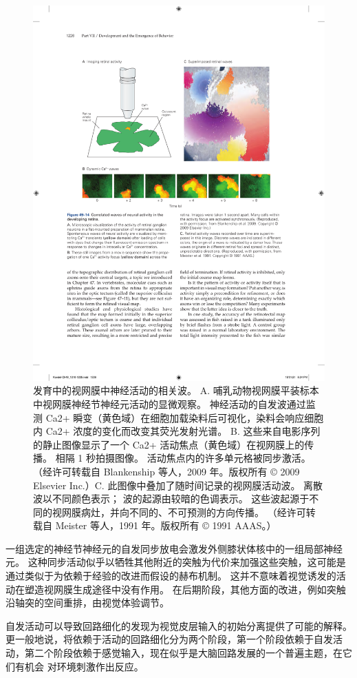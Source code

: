 \begin{figure}[htbp]
	\centering
	\includegraphics[width=0.8\linewidth]{chap49/fig_49_14}
	\caption{发育中的视网膜中神经活动的相关波。 A. 哺乳动物视网膜平装标本中视网膜神经节神经元活动的显微观察。 神经活动的自发波通过监测 Ca2+ 瞬变（黄色域）在细胞加载染料后可视化，染料会响应细胞内 Ca2+ 浓度的变化而改变其荧光发射光谱。 B. 这些来自电影序列的静止图像显示了一个 Ca2+ 活动焦点（黄色域）在视网膜上的传播。 相隔 1 秒拍摄图像。 活动焦点内的许多单元格被同步激活。 （经许可转载自 Blankenship 等人，2009 年。版权所有 © 2009 Elsevier Inc.）C. 此图像中叠加了随时间记录的视网膜活动波。 离散波以不同颜色表示； 波的起源由较暗的色调表示。 这些波起源于不同的视网膜病灶，并向不同的、不可预测的方向传播。 （经许可转载自 Meister 等人，1991 年。版权所有 © 1991 AAAS。）}
	\label{fig:49_14}
\end{figure}

一组选定的神经节神经元的自发同步放电会激发外侧膝状体核中的一组局部神经元。 这种同步活动似乎以牺牲其他附近的突触为代价来加强这些突触，这可能是通过类似于为依赖于经验的改进而假设的赫布机制。 这并不意味着视觉诱发的活动在塑造视网膜生成途径中没有作用。 在后期阶段，其他方面的改进，例如突触沿轴突的空间重排，由视觉体验调节。

自发活动可以导致回路细化的发现为视觉皮层输入的初始分离提供了可能的解释。 更一般地说，将依赖于活动的回路细化分为两个阶段，第一个阶段依赖于自发活动，第二个阶段依赖于感觉输入，现在似乎是大脑回路发展的一个普遍主题，在它们有机会 对环境刺激作出反应。

